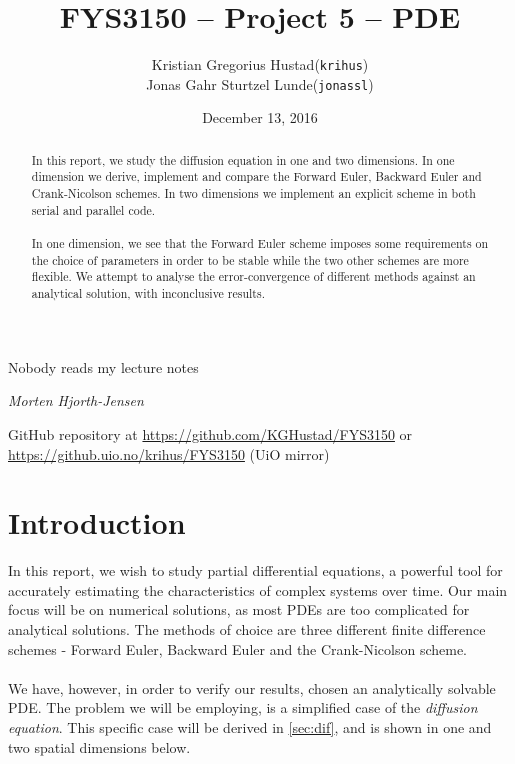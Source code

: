 \documentclass[10pt,a4paper]{article}
\begin{document}
\title{FYS3150 -- Project 5 -- PDE}
\author{
	\begin{tabular}{rl}
        Kristian Gregorius Hustad & (\texttt{krihus})\\
        Jonas Gahr Sturtzel Lunde & (\texttt{jonassl})
	\end{tabular}}
\date{December 13, 2016}
\maketitle



\setlength{\epigraphwidth}{0.75\textwidth}
\renewcommand{\epigraphflush}{center}
\renewcommand{\beforeepigraphskip}{50pt}
\renewcommand{\afterepigraphskip}{100pt}
\renewcommand{\epigraphsize}{\normalsize}
\epigraph{Nobody reads my lecture notes}
	{\textit{Morten Hjorth-Jensen}}

\begin{abstract}
\noindent
In this report, we study the diffusion equation in one and two dimensions. In one dimension we derive, implement and compare the Forward Euler, Backward Euler and Crank-Nicolson schemes. In two dimensions we implement an explicit scheme in both serial and parallel code.\\\\
In one dimension, we see that the Forward Euler scheme imposes some requirements on the choice of parameters in order to be stable while the two other schemes are more flexible. We attempt to analyse the error-convergence of different methods against an analytical solution, with inconclusive results.


\end{abstract}

\vfill


\begin{center}
    GitHub repository at \url{https://github.com/KGHustad/FYS3150}
    or \url{https://github.uio.no/krihus/FYS3150} (UiO mirror)
\end{center}


\pagebreak

\tableofcontents



\section{Introduction}
In this report, we wish to study partial differential equations, a powerful tool for accurately estimating the characteristics of complex systems over time. Our main focus will be on numerical solutions, as most PDEs are too complicated for analytical solutions. The methods of choice are three different finite difference schemes - Forward Euler, Backward Euler and the Crank-Nicolson scheme.
\\\\
We have, however, in order to verify our results, chosen an analytically solvable PDE. The problem we will be employing, is a simplified case of the \textit{diffusion equation}. This specific case will be derived in \vref{sec:dif}, and is shown in one and two spatial dimensions below.
\end{document}
